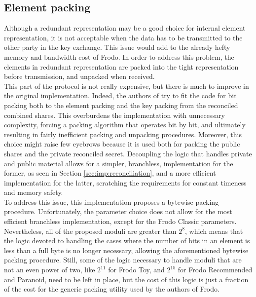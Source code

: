 \subsection{Element packing}
Although a redundant representation may be a good choice for internal element representation, it is not acceptable when the data has to be transmitted to the other party in the key exchange. This issue would add to the already hefty memory and bandwidth cost of Frodo. In order to address this problem, the elements in redundant representation are packed into the tight representation before transmission, and unpacked when received.\\
This part of the protocol is not really expensive, but there is much to improve in the original implementation. Indeed, the authors of \cite{frodo} try to fit the code for bit packing both to the element packing and the key packing from the reconciled combined shares. This overburdens the implementation with unnecessary complexity, forcing a packing algorithm that operates bit by bit, and ultimately resulting in fairly inefficient packing and unpacking procedures. Moreover, this choice might raise few eyebrows because it is used both for packing the public shares and the private reconciled secret. Decoupling the logic that handles private and public material allows for a simpler, branchless, implementation for the former, as seen in Section \ref{sec:imp:reconciliation}, and a more efficient implementation for the latter, scratching the requirements for constant timeness and memory safety.\\
To address this issue, this implementation proposes a bytewise packing procedure. Unfortunately, the parameter choice does not allow for the most efficient branchless implementation, except for the Frodo Classic parameters. Nevertheless, all of the proposed moduli are greater than $2^8$, which means that the logic devoted to handling the cases where the number of bits in an element is less than a full byte is no longer necessary, allowing the aforementioned bytewise packing procedure. Still, some of the logic necessary to handle moduli that are not an even power of two, like $2^11$ for Frodo Toy, and $2^15$ for Frodo Recommended and Paranoid, need to be left in place, but the cost of this logic is just a  fraction of the cost for the generic packing utility used by the authors of Frodo.